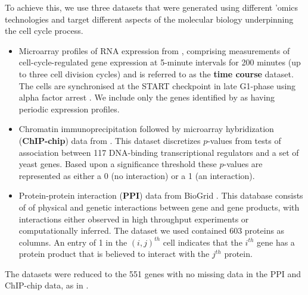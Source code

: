 \documentclass{bmcart}
\begin{document}
To achieve this, we use three datasets that were generated using different 'omics technologies and target different aspects of the molecular biology underpinning the cell cycle process.
\begin{itemize}
	\item Microarray profiles of RNA expression from \cite{granovskaia2010high}, comprising measurements of cell-cycle-regulated gene expression at 5-minute intervals for 200 minutes (up to three cell division cycles) and is referred to as the \textbf{time course} dataset. The cells are synchronised at the START checkpoint in late G1-phase using alpha factor arrest
	\citep{granovskaia2010high}. We include only the genes identified by \cite{granovskaia2010high} as having periodic expression profiles.
	\item Chromatin immunoprecipitation followed by microarray hybridization (\textbf{ChIP-chip}) data from \cite{harbison2004transcriptional}. This dataset discretizes $p$-values from tests of association between 117 DNA-binding transcriptional regulators and a set of yeast genes. Based upon a significance threshold these $p$-values are represented as either a 0 (no interaction) or a 1 (an interaction).
	\item Protein-protein interaction (\textbf{PPI}) data from BioGrid \citep{stark2006biogrid}. This database consists of of physical and genetic interactions between gene and gene products, with interactions either observed in high throughput experiments or computationally inferred. The dataset we used contained 603 proteins as columns. An entry of 1 in the $(i, j)^{th}$ cell indicates that the $i^{th}$ gene has a protein product that is believed to interact with the $j^{th}$ protein.
\end{itemize}
The datasets were reduced to the 551 genes with no missing data in the PPI and ChIP-chip data, as in \cite{kirk2012bayesian}. 
\end{document}
